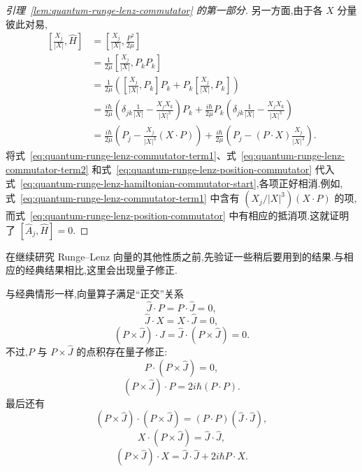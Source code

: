 {\begin{proof}[引理~\ref{lem:quantum-runge-lenz-commutator} 的第一部分]
另一方面,由于各 $X$ 分量彼此对易,
\[
\begin{aligned}
 \left[\frac{X_j}{|X|},\widehat H\right]
 &=\left[\frac{X_j}{|X|},\frac{P^2}{2\mu}\right]\\
 &=\frac1{2\mu}\left[\frac{X_j}{|X|},P_kP_k\right]\\
 &=\frac1{2\mu}\left(\left[\frac{X_j}{|X|},P_k\right]P_k
 +P_k\left[\frac{X_j}{|X|},P_k\right]\right)\\
 &=\frac{i\hbar}{2\mu}\left(\delta_{jk}\frac1{|X|}-\frac{X_jX_k}{|X|^3}\right)P_k
 +\frac{i\hbar}{2\mu}P_k\left(\delta_{jk}\frac1{|X|}-\frac{X_jX_k}{|X|^3}\right)\\
 &=\frac{i\hbar}{2\mu}\left(P_j-\frac{X_j}{|X|^3}(X\cdot P)\right)
 +\frac{i\hbar}{2\mu}\left(P_j-(P\cdot X)\frac{X_j}{|X|^3}\right).
\end{aligned}
\label{eq:quantum-runge-lenz-position-commutator}
\]
将式~\eqref{eq:quantum-runge-lenz-commutator-term1}、式~\eqref{eq:quantum-runge-lenz-commutator-term2} 和式~\eqref{eq:quantum-runge-lenz-position-commutator} 代入式~\eqref{eq:quantum-runge-lenz-hamiltonian-commutator-start},各项正好相消.例如,式~\eqref{eq:quantum-runge-lenz-commutator-term1} 中含有 $(X_j/|X|^3)(X\cdot P)$ 的项,而式~\eqref{eq:quantum-runge-lenz-position-commutator} 中有相应的抵消项.这就证明了 $[\widehat A_j,\widehat H]=0$.
\end{proof}

在继续研究 Runge--Lenz 向量的其他性质之前,先验证一些稍后要用到的结果.与相应的经典结果相比,这里会出现量子修正.

\begin{lemma}\label{lem:runge-lenz-orthogonality}
与经典情形一样,向量算子满足“正交”关系
\[
 \widehat J\cdot P=P\cdot\widehat J=0,
\label{eq:runge-lenz-jp-orthogonal}
\]
\[
 \widehat J\cdot X=X\cdot\widehat J=0,
\label{eq:runge-lenz-jx-orthogonal}
\]
\[
 (P\times\widehat J)\cdot\widehat J
 =\widehat J\cdot(P\times\widehat J)=0.
\label{eq:runge-lenz-pj-j-orthogonal}
\]
不过,$P$ 与 $P\times\widehat J$ 的点积存在量子修正:
\[
 P\cdot(P\times\widehat J)=0,
\label{eq:runge-lenz-p-pj}
\]
\[
 (P\times\widehat J)\cdot P=2i\hbar(P\cdot P).
\label{eq:runge-lenz-pj-p}
\]
最后还有
\[
 (P\times\widehat J)\cdot(P\times\widehat J)=(P\cdot P)(\widehat J\cdot\widehat J),
\label{eq:runge-lenz-pj-square}
\]
\[
 X\cdot(P\times\widehat J)=\widehat J\cdot\widehat J,
\label{eq:runge-lenz-x-pj}
\]
\[
 (P\times\widehat J)\cdot X=\widehat J\cdot\widehat J+2i\hbar P\cdot X.
\label{eq:runge-lenz-pj-x}
\]
\end{lemma}

}
